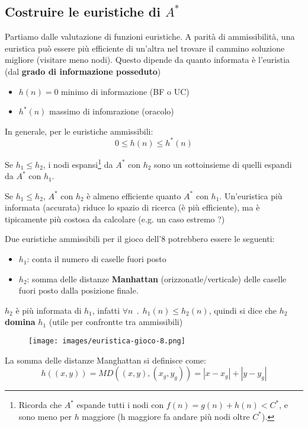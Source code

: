 \subsection{Costruire le euristiche di $A^*$}
Partiamo dalle valutazione di funzioni euristiche. A parità di ammissibilità, una euristica può essere più
efficiente di un’altra nel trovare il cammino soluzione migliore (visitare meno nodi). Questo dipende da quanto
informata è l'euristia (dal \textbf{grado di informazione posseduto}) 
\begin{itemize}
    \item $h(n) = 0$ minimo di informazione (BF o UC)
    \item $h^*(n)$ massimo di infomrazione (oracolo)
\end{itemize}
In generale, per le euristiche ammissibili:
$$0 \leq h(n) \leq h^*(n)$$
\begin{theorem}
    Se $h_1 \leq h_2$, i nodi espansi\footnote{Ricorda che $A^*$ espande tutti i nodi con $f(n) = g(n) + h(n) < C^*$, e sono meno per $h$ maggiore (h maggiore fa andare più nodi oltre $C^*$).} da $A^*$ con $h_2$ sono un sottoinsieme di quelli espandi da $A^*$ con $h_1$.
\end{theorem}
Se $h_1 \leq h_2$, $A^*$ con $h_2$ è almeno efficiente quanto $A^*$ con $h_1$.
Un’euristica più informata (accurata) riduce lo spazio di ricerca (è più efficiente), ma è tipicamente più costosa da calcolare (e.g. un caso estremo ?)
\begin{example}
    Due euristiche ammissibili per il gioco dell'8 potrebbero essere le seguenti:
    \begin{itemize}
        \item $h_1$: conta il numero di caselle fuori posto
        \item $h_2$: somma delle distanze \textbf{Manhattan} (orizzonatle/verticale) delle caselle fuori posto dalla posizione finale.
    \end{itemize}
    $h_2$ è più informata di $h_1$, infatti $\forall n \:\:.\:\: h_1(n) \leq h_2(n)$, quindi si dice che $h_2$ \textbf{domina} $h_1$ (utile per confrontte tra ammissibili)
    \begin{figure}[h!]
        \centering
        \texttt{[image: images/euristica-gioco-8.png]}
    \end{figure}
\end{example}
\begin{definition}
    La somma delle distanze Manghattan si definisce come:
    $$h((x,y)) = MD((x,y), (x_g, y_g)) = |x - x_g| + |y - y_g|$$
\end{definition}

